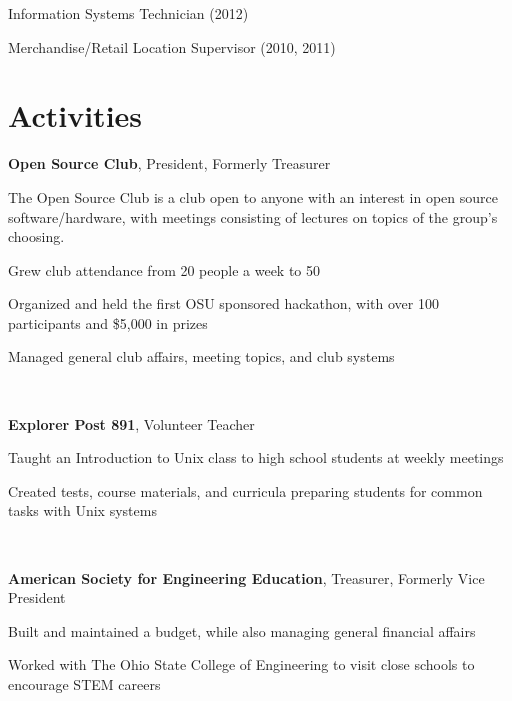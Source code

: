 \documentclass[letterpaper]{resume}
\begin{document}
Information Systems Technician (2012)
%
%
%

Merchandise/Retail Location Supervisor (2010, 2011)

%

\section{Activities}

\textbf{Open Source Club}, President, Formerly Treasurer
\begin{compactitem}
\item The Open Source Club is a club open to anyone with an
	interest in open source software/hardware, with meetings consisting of
	lectures on topics of the group's choosing.
\item Grew club attendance from 20 people a week to 50
\item Organized and held the first OSU sponsored hackathon, with over 100 participants and \$5,000 in prizes
\item Managed general club affairs, meeting topics, and club systems
\end{compactitem}

~

\textbf{Explorer Post 891}, Volunteer Teacher
\begin{compactitem}
\item Taught an Introduction to Unix class to high school students at
	weekly meetings
\item Created tests, course materials, and curricula preparing students
	for common tasks with Unix systems
\end{compactitem}

~

\textbf{American Society for Engineering Education}, Treasurer, Formerly Vice President%
\begin{compactitem}
\item Built and maintained a budget, while also managing general financial affairs
\item Worked with The Ohio State College of Engineering to visit close schools to encourage STEM careers
\end{compactitem}
\end{document}

